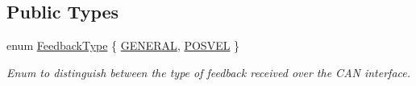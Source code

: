 \subsection*{Public Types}
\begin{DoxyCompactItemize}
\item 
enum \hyperlink{classuwrt_1_1arm_1_1_arm_h_w_real_ab0b3eb7330f9aa0f1101506fde2a889a}{Feedback\+Type} \{ \hyperlink{classuwrt_1_1arm_1_1_arm_h_w_real_ab0b3eb7330f9aa0f1101506fde2a889aa64a4abb154db9a6878c1d2e6053bd852}{G\+E\+N\+E\+R\+AL}, 
\hyperlink{classuwrt_1_1arm_1_1_arm_h_w_real_ab0b3eb7330f9aa0f1101506fde2a889aaded4c5ee9a1b43522d0a529e952bc21b}{P\+O\+S\+V\+EL}
 \}\begin{DoxyCompactList}\small\item\em Enum to distinguish between the type of feedback received over the C\+AN interface. \end{DoxyCompactList}
\end{DoxyCompactItemize}
